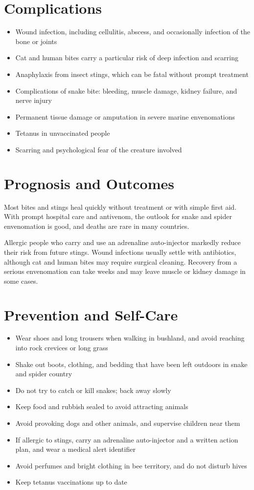 \section*{Complications}
\begin{itemize}
    \item Wound infection, including cellulitis, abscess, and occasionally infection of the bone or joints
    \item Cat and human bites carry a particular risk of deep infection and scarring
    \item Anaphylaxis from insect stings, which can be fatal without prompt treatment
    \item Complications of snake bite: bleeding, muscle damage, kidney failure, and nerve injury
    \item Permanent tissue damage or amputation in severe marine envenomations
    \item Tetanus in unvaccinated people
    \item Scarring and psychological fear of the creature involved
\end{itemize}

\section*{Prognosis and Outcomes}
Most bites and stings heal quickly without treatment or with simple first aid. With prompt hospital care and antivenom, the outlook for snake and spider envenomation is good, and deaths are rare in many countries.

Allergic people who carry and use an adrenaline auto-injector markedly reduce their risk from future stings. Wound infections usually settle with antibiotics, although cat and human bites may require surgical cleaning. Recovery from a serious envenomation can take weeks and may leave muscle or kidney damage in some cases.

\section*{Prevention and Self-Care}
\begin{itemize}
    \item Wear shoes and long trousers when walking in bushland, and avoid reaching into rock crevices or long grass
    \item Shake out boots, clothing, and bedding that have been left outdoors in snake and spider country
    \item Do not try to catch or kill snakes; back away slowly
    \item Keep food and rubbish sealed to avoid attracting animals
    \item Avoid provoking dogs and other animals, and supervise children near them
    \item If allergic to stings, carry an adrenaline auto-injector and a written action plan, and wear a medical alert identifier
    \item Avoid perfumes and bright clothing in bee territory, and do not disturb hives
    \item Keep tetanus vaccinations up to date
\end{itemize}

